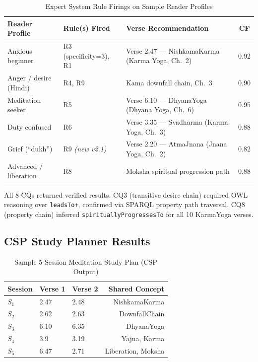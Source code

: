 \documentclass[conference]{IEEEtran}
\begin{document}
\begin{table}[!t]
\caption{Expert System Rule Firings on Sample Reader Profiles}
\label{tab:expert}
\centering
\begin{tabular}{@{}l l l c@{}}
\toprule
\textbf{Reader Profile} & \textbf{Rule(s) Fired} & \textbf{Verse Recommendation} & \textbf{CF} \\
\midrule
Anxious beginner          & R3 (specificity=3), R1 & Verse 2.47 — NishkamaKarma (Karma Yoga, Ch.~2)  & 0.92 \\
Anger / desire (Hindi)    & R4, R9                 & Kama downfall chain, Ch.~3                       & 0.90 \\
Meditation seeker         & R5                     & Verse 6.10 — DhyanaYoga (Dhyana Yoga, Ch.~6)    & 0.95 \\
Duty confused             & R6                     & Verse 3.35 — Svadharma (Karma Yoga, Ch.~3)      & 0.88 \\
Grief (``dukh'')          & R9 \textit{(new v2.1)} & Verse 2.20 — AtmaJnana (Jnana Yoga, Ch.~2)      & 0.82 \\
Advanced / liberation     & R8                     & Moksha spiritual progression path               & 0.88 \\
\bottomrule
\end{tabular}
\end{table}

All 8 CQs returned verified results. CQ3 (transitive desire chain)
required OWL reasoning over \texttt{leadsTo+}, confirmed via SPARQL
property path traversal. CQ8 (property chain) inferred
\texttt{spirituallyProgressesTo} for all 10 KarmaYoga verses.

\subsection{CSP Study Planner Results}

\begin{table}[htbp]
\caption{Sample 5-Session Meditation Study Plan (CSP Output)}
\label{tab:csp}
\centering
\begin{tabular}{lllr}
\toprule
\textbf{Session} & \textbf{Verse 1} & \textbf{Verse 2} & \textbf{Shared Concept} \\
\midrule
$S_1$ & 2.47 & 2.48 & NishkamaKarma \\
$S_2$ & 2.62 & 2.63 & DownfallChain \\
$S_3$ & 6.10 & 6.35 & DhyanaYoga \\
$S_4$ & 3.9  & 3.19 & Yajna, Karma \\
$S_5$ & 6.47 & 2.71 & Liberation, Moksha \\
\bottomrule
\end{tabular}
\end{table}
\end{document}
